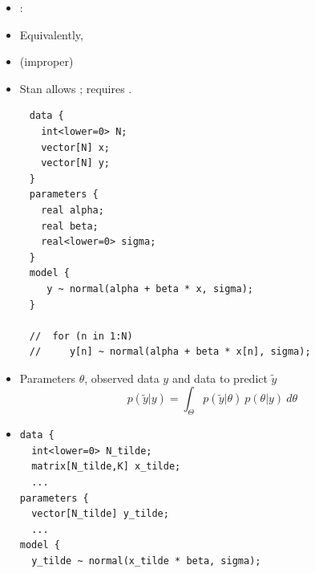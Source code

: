 \documentclass[10pt]{report}
\begin{document}
\begin{itemize}
\item {}:
\item Equivalently,
\item {} (improper)
\item Stan allows ; requires .
\end{itemize}


{\footnotesize
\begin{Verbatim}
     data {
       int<lower=0> N;
       vector[N] x;
       vector[N] y;
     }
     parameters {
       real alpha;   
       real beta;
       real<lower=0> sigma;
     }
     model {
        y ~ normal(alpha + beta * x, sigma);
     }

     //  for (n in 1:N)
     //     y[n] ~ normal(alpha + beta * x[n], sigma);
\end{Verbatim}
}

\begin{itemize}
\item Parameters $\theta$, observed data $y$ and data to predict $\tilde{y}$
\[
p(\tilde{y}|y) = \int_{\Theta} p(\tilde{y}|\theta) \ p(\theta|y) \ d\theta
\]
\item 
{\small
\begin{Verbatim}
data {
  int<lower=0> N_tilde;
  matrix[N_tilde,K] x_tilde;
  ...
parameters {
  vector[N_tilde] y_tilde;
  ...
model {
  y_tilde ~ normal(x_tilde * beta, sigma);
\end{Verbatim}
}
\end{itemize}
\end{document}

